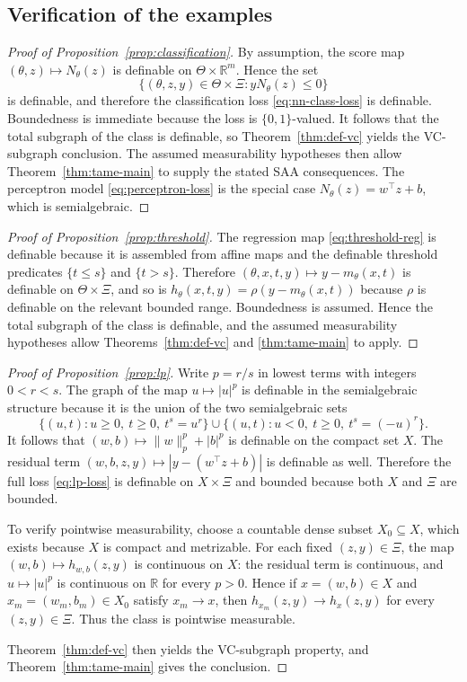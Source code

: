 \documentclass[11pt]{article}
\begin{document}
\subsection{Verification of the examples}
\begin{proof}[Proof of Proposition~\ref{prop:classification}]
By assumption, the score map $(\theta,z)\mapsto N_{\theta}(z)$ is
definable on $\Theta\times\mathbb{R}^{m}$. Hence the set 
\[
\{(\theta,z,y)\in\Theta\times\Xi:yN_{\theta}(z)\le0\}
\]
is definable, and therefore the classification loss \eqref{eq:nn-class-loss}
is definable. Boundedness is immediate because the loss is $\{0,1\}$-valued.
It follows that the total subgraph of the class is definable, so Theorem~\ref{thm:def-vc}
yields the VC-subgraph conclusion. The assumed measurability hypotheses
then allow Theorem~\ref{thm:tame-main} to supply the stated SAA
consequences. The perceptron model \eqref{eq:perceptron-loss} is
the special case $N_{\theta}(z)=w^{\top}z+b$, which is semialgebraic. 
\end{proof}
%
\begin{proof}[Proof of Proposition~\ref{prop:threshold}]
The regression map \eqref{eq:threshold-reg} is definable because
it is assembled from affine maps and the definable threshold predicates
$\{t\le s\}$ and $\{t>s\}$. Therefore $(\theta,x,t,y)\mapsto y-m_{\theta}(x,t)$
is definable on $\Theta\times\Xi$, and so is $h_{\theta}(x,t,y)=\rho(y-m_{\theta}(x,t))$
because $\rho$ is definable on the relevant bounded range. Boundedness
is assumed. Hence the total subgraph of the class is definable, and
the assumed measurability hypotheses allow Theorems~\ref{thm:def-vc}
and \ref{thm:tame-main} to apply. 
\end{proof}
%
\begin{proof}[Proof of Proposition~\ref{prop:lp}]
Write $p=r/s$ in lowest terms with integers $0<r<s$. The graph
of the map $u\mapsto|u|^{p}$ is definable in the semialgebraic structure
because it is the union of the two semialgebraic sets
\[
\{(u,t):u\ge0,\ t\ge0,\ t^{s}=u^{r}\}
\cup\{(u,t):u<0,\ t\ge0,\ t^{s}=(-u)^{r}\}.
\]
It follows that $(w,b)\mapsto\lVert w\rVert_{p}^{p}+|b|^{p}$ is definable
on the compact set $X$. The residual term $(w,b,z,y)\mapsto|y-(w^{\top}z+b)|$
is definable as well. Therefore the full loss \eqref{eq:lp-loss}
is definable on $X\times\Xi$ and bounded because both $X$ and $\Xi$
are bounded.

To verify pointwise measurability, choose a countable dense subset
$X_{0}\subseteq X$, which exists because $X$ is compact and metrizable.
For each fixed $(z,y)\in\Xi$, the map $(w,b)\mapsto h_{w,b}(z,y)$
is continuous on $X$: the residual term is continuous, and $u\mapsto|u|^{p}$
is continuous on $\mathbb{R}$ for every $p>0$. Hence if $x=(w,b)\in X$
and $x_{m}=(w_{m},b_{m})\in X_{0}$ satisfy $x_{m}\to x$, then $h_{x_{m}}(z,y)\to h_{x}(z,y)$
for every $(z,y)\in\Xi$. Thus the class is pointwise measurable.

Theorem~\ref{thm:def-vc} then yields the VC-subgraph property, and
Theorem~\ref{thm:tame-main} gives the conclusion. 
\end{proof}
\end{document}
